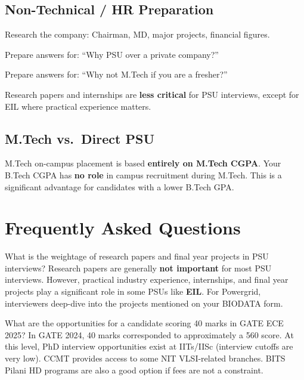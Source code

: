 \subsection{Non-Technical / HR Preparation}

\begin{pfChecklist}
  \item Research the company: Chairman, MD, major projects, financial figures.
  \item Prepare answers for: ``Why PSU over a private company?''
  \item Prepare answers for: ``Why not M.Tech if you are a fresher?''
  \item Research papers and internships are \textbf{less critical} for PSU
        interviews, except for EIL where practical experience matters.
\end{pfChecklist}

\subsection{M.Tech vs.\ Direct PSU}

\begin{eligalert}
  M.Tech on-campus placement is based \textbf{entirely on M.Tech CGPA}.
  Your B.Tech CGPA has \textbf{no role} in campus recruitment during M.Tech.
  This is a significant advantage for candidates with a lower B.Tech GPA.
\end{eligalert}

\section{Frequently Asked Questions}
\label{sec:psu-faq}

\begin{faqentry}{What is the weightage of research papers and final year
  projects in PSU interviews?}
  Research papers are generally \textbf{not important} for most PSU interviews.
  However, practical industry experience, internships, and final year projects
  play a significant role in some PSUs like \textbf{EIL}. For Powergrid,
  interviewers deep-dive into the projects mentioned on your BIODATA form.
\end{faqentry}

\begin{faqentry}{What are the opportunities for a candidate scoring 40 marks
  in GATE ECE 2025?}
  In GATE 2024, 40 marks corresponded to approximately a 560 score. At this
  level, PhD interview opportunities exist at IITs/IISc (interview cutoffs are
  very low). CCMT provides access to some NIT VLSI-related branches. BITS Pilani
  HD programs are also a good option if fees are not a constraint.
\end{faqentry}
